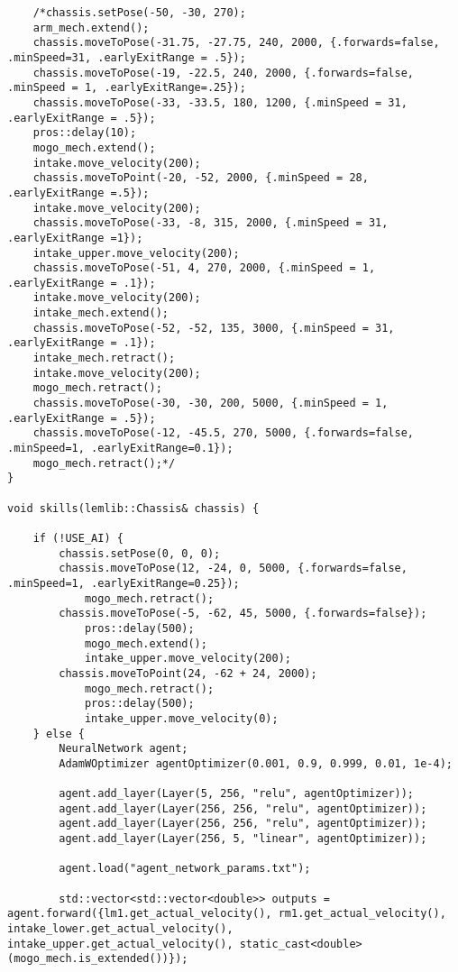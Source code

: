 \begin{verbatim}
    /*chassis.setPose(-50, -30, 270);
    arm_mech.extend();
    chassis.moveToPose(-31.75, -27.75, 240, 2000, {.forwards=false, .minSpeed=31, .earlyExitRange = .5});
    chassis.moveToPose(-19, -22.5, 240, 2000, {.forwards=false, .minSpeed = 1, .earlyExitRange=.25});
    chassis.moveToPose(-33, -33.5, 180, 1200, {.minSpeed = 31, .earlyExitRange = .5});
    pros::delay(10);
    mogo_mech.extend();
    intake.move_velocity(200);
    chassis.moveToPoint(-20, -52, 2000, {.minSpeed = 28, .earlyExitRange =.5});
    intake.move_velocity(200);
    chassis.moveToPose(-33, -8, 315, 2000, {.minSpeed = 31, .earlyExitRange =1});
    intake_upper.move_velocity(200);
    chassis.moveToPose(-51, 4, 270, 2000, {.minSpeed = 1, .earlyExitRange = .1});
    intake.move_velocity(200);
    intake_mech.extend();
    chassis.moveToPose(-52, -52, 135, 3000, {.minSpeed = 31, .earlyExitRange = .1});
    intake_mech.retract();
    intake.move_velocity(200);
    mogo_mech.retract();
    chassis.moveToPose(-30, -30, 200, 5000, {.minSpeed = 1, .earlyExitRange = .5});
    chassis.moveToPose(-12, -45.5, 270, 5000, {.forwards=false, .minSpeed=1, .earlyExitRange=0.1});
    mogo_mech.retract();*/
}

void skills(lemlib::Chassis& chassis) {

    if (!USE_AI) {
        chassis.setPose(0, 0, 0);
        chassis.moveToPose(12, -24, 0, 5000, {.forwards=false, .minSpeed=1, .earlyExitRange=0.25});
            mogo_mech.retract();
        chassis.moveToPose(-5, -62, 45, 5000, {.forwards=false});
            pros::delay(500);
            mogo_mech.extend();
            intake_upper.move_velocity(200);
        chassis.moveToPoint(24, -62 + 24, 2000);
            mogo_mech.retract();
            pros::delay(500);
            intake_upper.move_velocity(0);
    } else {
        NeuralNetwork agent;
        AdamWOptimizer agentOptimizer(0.001, 0.9, 0.999, 0.01, 1e-4);

        agent.add_layer(Layer(5, 256, "relu", agentOptimizer));
        agent.add_layer(Layer(256, 256, "relu", agentOptimizer));
        agent.add_layer(Layer(256, 256, "relu", agentOptimizer));
        agent.add_layer(Layer(256, 5, "linear", agentOptimizer));

        agent.load("agent_network_params.txt");

        std::vector<std::vector<double>> outputs = agent.forward({lm1.get_actual_velocity(), rm1.get_actual_velocity(), intake_lower.get_actual_velocity(), intake_upper.get_actual_velocity(), static_cast<double>(mogo_mech.is_extended())});


\end{verbatim}
